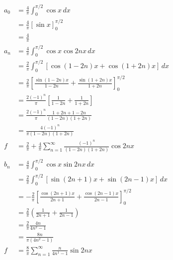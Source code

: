 \documentclass{article}
\begin{document}
\begin{align*}
  a_0 & = \frac{4}{\pi} \int_0^{\pi / 2} \cos x \,d x                                                                   \\
      & = \frac{4}{\pi} [\sin x]_0^{\pi / 2}                                                                            \\
      & = \frac{4}{\pi}                                                                                                 \\
  a_n & = \frac{4}{\pi} \int_0^{\pi / 2} \cos x \cos 2 n x \,d x                                                        \\
      & = \frac{2}{\pi} \int_0^{\pi / 2} [\cos (1 - 2 n) x + \cos (1 + 2 n) x] \,d x                                    \\
      & = \frac{2}{\pi} \left[ \frac{\sin (1 - 2 n) x}{1 - 2 n} + \frac{\sin (1 + 2 n) x}{1 + 2 n} \right]_0^{\pi / 2}  \\
      & = \frac{2 (-1)^n}{\pi} \left[ \frac{1}{1 - 2 n} + \frac{1}{1 + 2 n} \right]                                     \\
      & = \frac{2 (-1)^n}{\pi} \frac{1 + 2 n + 1 - 2 n}{(1 - 2 n) (1 + 2 n)}                                            \\
      & = \frac{4 (-1)^n}{\pi (1 - 2 n) (1 + 2 n)}                                                                      \\
  f   & = \frac{2}{\pi} + \frac{4}{\pi} \sum_{n = 1}^\infty \frac{(-1)^n}{(1 - 2 n) (1 + 2 n)} \cos 2 n x               \\ \\
  b_n & = \frac{4}{\pi} \int_0^{\pi / 2} \cos x \sin 2 n x \,d x                                                        \\
      & = \frac{2}{\pi} \int_0^{\pi / 2} [\sin (2 n + 1) x + \sin (2 n - 1) x] \,d x                                    \\
      & = -\frac{2}{\pi} \left[ \frac{\cos (2 n + 1) x}{2 n + 1} + \frac{\cos (2 n - 1) x}{2 n - 1} \right]_0^{\pi / 2} \\
      & = \frac{2}{\pi} \left( \frac{1}{2 n + 1} + \frac{1}{2 n - 1} \right)                                            \\
      & = \frac{2}{\pi} \frac{4 n}{4 n^2 - 1}                                                                           \\
      & = \frac{8 n}{\pi (4 n^2 - 1)}                                                                                   \\
  f   & = \frac{8}{\pi} \sum_{n = 1}^\infty \frac{n}{4 n^1 - 1} \sin 2 n x
\end{align*}
\end{document}
